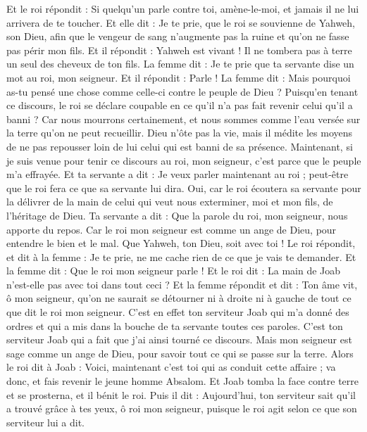 \begin{multicols}{2}
Et le roi répondit : Si quelqu'un parle contre toi, amène-le-moi, et jamais il ne lui arrivera de te toucher.
Et elle dit : Je te prie, que le roi se souvienne de Yahweh, son Dieu, afin que le vengeur de sang n'augmente pas la ruine et qu'on ne fasse pas périr mon fils. Et il répondit : Yahweh est vivant ! Il ne tombera pas à terre un seul des cheveux de ton fils.
La femme dit : Je te prie que ta servante dise un mot au roi, mon seigneur. Et il répondit : Parle !
La femme dit : Mais pourquoi as-tu pensé une chose comme celle-ci contre le peuple de Dieu ? Puisqu'en tenant ce discours, le roi se déclare coupable en ce qu'il n'a pas fait revenir celui qu'il a banni ?
Car nous mourrons certainement, et nous sommes comme l'eau versée sur la terre qu'on ne peut recueillir. Dieu n'ôte pas la vie, mais il médite les moyens de ne pas repousser loin de lui celui qui est banni de sa présence.
Maintenant, si je suis venue pour tenir ce discours au roi, mon seigneur, c'est parce que le peuple m'a effrayée. Et ta servante a dit : Je veux parler maintenant au roi ; peut-être que le roi fera ce que sa servante lui dira.
Oui, car le roi écoutera sa servante pour la délivrer de la main de celui qui veut nous exterminer, moi et mon fils, de l'héritage de Dieu.
Ta servante a dit : Que la parole du roi, mon seigneur, nous apporte du repos. Car le roi mon seigneur est comme un ange de Dieu, pour entendre le bien et le mal. Que Yahweh, ton Dieu, soit avec toi !
Le roi répondit, et dit à la femme : Je te prie, ne me cache rien de ce que je vais te demander. Et la femme dit : Que le roi mon seigneur parle !
Et le roi dit : La main de Joab n'est-elle pas avec toi dans tout ceci ? Et la femme répondit et dit : Ton âme vit, ô mon seigneur, qu'on ne saurait se détourner ni à droite ni à gauche de tout ce que dit le roi mon seigneur. C'est en effet ton serviteur Joab qui m'a donné des ordres et qui a mis dans la bouche de ta servante toutes ces paroles.
C'est ton serviteur Joab qui a fait que j'ai ainsi tourné ce discours. Mais mon seigneur est sage comme un ange de Dieu, pour savoir tout ce qui se passe sur la terre.
Alors le roi dit à Joab : Voici, maintenant c'est toi qui as conduit cette affaire ; va donc, et fais revenir le jeune homme Absalom.
Et Joab tomba la face contre terre et se prosterna, et il bénit le roi. Puis il dit : Aujourd'hui, ton serviteur sait qu'il a trouvé grâce à tes yeux, ô roi mon seigneur, puisque le roi agit selon ce que son serviteur lui a dit.

\end{multicols}
